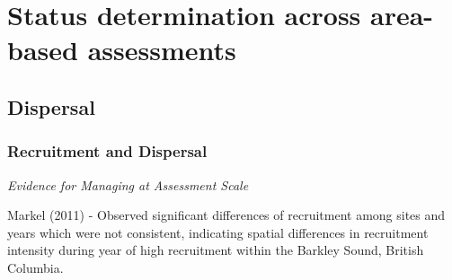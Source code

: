 \documentclass[11pt,
  english,
  a4paper,
]{article}
\begin{document}
\pagebreak
{}
\setcounter{page}{1}

\renewcommand{\thetable}{\roman{table}}
\renewcommand{\thefigure}{\roman{figure}}

\setlength\parskip{0.5em plus 0.1em minus 0.2em}

\pagebreak
\setlength{\parskip}{5mm plus1mm minus1mm}
\setcounter{page}{1}
\renewcommand{\thefigure}{\arabic{figure}}
\renewcommand{\thetable}{\arabic{table}}
\setcounter{table}{0}
\setcounter{figure}{0}

\setlength\parskip{0.2em plus 0.1em minus 0.2em}


\hypertarget{status-determination-across-area-based-assessments}{%
\section{Status determination across area-based assessments}\label{status-determination-across-area-based-assessments}}

\leavevmode\tagmcend\tagstructend


\hypertarget{dispersal}{%
\subsection{Dispersal}\label{dispersal}}

\leavevmode\tagmcend\tagstructend


\hypertarget{recruitment-and-dispersal}{%
\subsubsection{Recruitment and Dispersal}\label{recruitment-and-dispersal}}

\leavevmode\tagmcend\tagstructend


\emph{Evidence for Managing at Assessment Scale}

\leavevmode\tagmcend\tagstructend\par


Markel {(2011)\leavevmode\tagmcend\tagstructend} - Observed significant differences of recruitment among sites and years which were not consistent, indicating spatial differences in recruitment intensity during year of high recruitment within the Barkley Sound, British Columbia.
\end{document}
